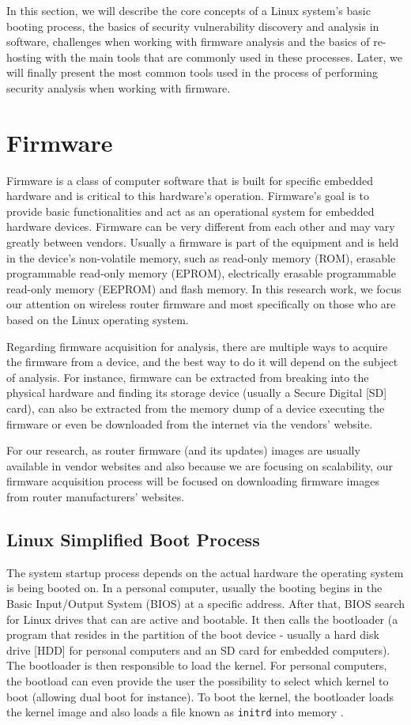 In this section, we will describe the core concepts of a Linux system's basic booting process, the basics of security vulnerability discovery and analysis in software, challenges when working with firmware analysis and the basics of re-hosting with the main tools that are commonly used in these processes. Later, we will finally present the most common tools used in the process of performing security analysis when working with firmware.

\section{Firmware}

Firmware is a class of computer software that is built for specific embedded hardware and is critical to this hardware's operation. Firmware's goal is to provide basic functionalities and act as an operational system for embedded hardware devices. Firmware can be very different from each other and may vary greatly between vendors. Usually a firmware is part of the equipment and is held in the device's non-volatile memory, such as read-only memory (ROM), erasable programmable read-only memory (EPROM), electrically erasable programmable read-only memory (EEPROM) and flash memory. In this research work, we focus our attention on wireless router firmware and most specifically on those who are based on the Linux operating system.

Regarding firmware acquisition for analysis, there are multiple ways to acquire the firmware from a device, and the best way to do it will depend on the subject of analysis. For instance, firmware can be extracted from breaking into the physical hardware and finding its storage device (usually a Secure Digital [SD] card), can also be extracted from the memory dump of a device executing the firmware or even be downloaded from the internet via the vendors' website.

For our research, as router firmware (and its updates) images are usually available in vendor websites and also because we are focusing on scalability, our firmware acquisition process will be focused on downloading firmware images from router manufacturers' websites.

\subsection{Linux Simplified Boot Process}

The system startup process depends on the actual hardware the operating system is being booted on. In a personal computer, usually the booting begins in the Basic Input/Output System (BIOS) at a specific address. After that, BIOS search for Linux drives that can are active and bootable. It then calls the bootloader (a program that resides in the partition of the boot device - usually a hard disk drive [HDD] for personal computers and an SD card for embedded computers). The bootloader is then responsible to load the kernel. For personal computers, the bootload can even provide the user the possibility to select which kernel to boot (allowing dual boot for instance). To boot the kernel, the bootloader loads the kernel image and also loads a file known as {\tt initrd} into memory \cite{ibm-boot}.

